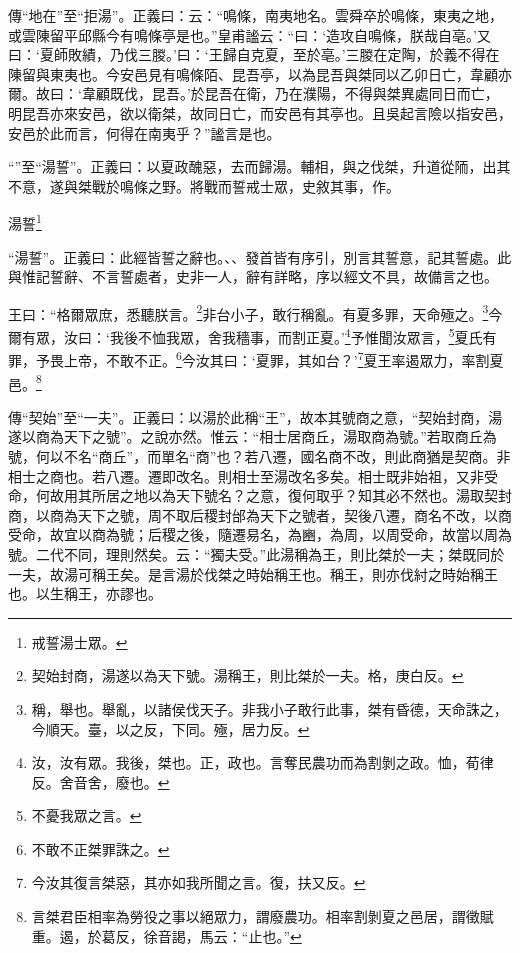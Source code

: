 {\noindent\zhuan{}\fzbyks 傳“地在”至“拒湯”。正義曰：云：“鳴條，南夷地名。雲舜卒於鳴條，東夷之地，或雲陳留平邱縣今有鳴條亭是也。”皇甫謐云：“曰：‘造攻自鳴條，朕哉自亳。’又曰：‘夏師敗績，乃伐三朡。’曰：‘王歸自克夏，至於亳。’三朡在定陶，於義不得在陳留與東夷也。今安邑見有鳴條陌、昆吾亭，以為昆吾與桀同以乙卯日亡，韋顧亦爾。故曰：‘韋顧既伐，昆吾。’於昆吾在衛，乃在濮陽，不得與桀異處同日而亡，明昆吾亦來安邑，欲以衛桀，故同日亡，而安邑有其亭也。且吳起言險以指安邑，安邑於此而言，何得在南夷乎？”謐言是也。 \par}

{\noindent\shu{}\fzkt “”至“湯誓”。正義曰：以夏政醜惡，去而歸湯。輔相，與之伐桀，升道從陑，出其不意，遂與桀戰於鳴條之野。將戰而誓戒士眾，史敘其事，作。 \par}

湯誓\footnote{戒誓湯士眾。}

{\noindent\shu{}\fzkt “湯誓”。正義曰：此經皆誓之辭也。、、發首皆有序引，別言其誓意，記其誓處。此與惟記誓辭、不言誓處者，史非一人，辭有詳略，序以經文不具，故備言之也。 \par}

王曰：“格爾眾庶，悉聽朕言。\footnote{契始封商，湯遂以為天下號。湯稱王，則比桀於一夫。格，庚白反。}非台小子，敢行稱亂。有夏多罪，天命殛之。\footnote{稱，舉也。舉亂，以諸侯伐天子。非我小子敢行此事，桀有昏德，天命誅之，今順天。臺，以之反，下同。殛，居力反。}今爾有眾，汝曰：‘我後不恤我眾，舍我穡事，而割正夏。’\footnote{汝，汝有眾。我後，桀也。正，政也。言奪民農功而為割剝之政。恤，荀律反。舍音舍，廢也。}予惟聞汝眾言，\footnote{不憂我眾之言。}夏氏有罪，予畏上帝，不敢不正。\footnote{不敢不正桀罪誅之。}今汝其曰：‘夏罪，其如台？’\footnote{今汝其復言桀惡，其亦如我所聞之言。復，扶又反。}夏王率遏眾力，率割夏邑。\footnote{言桀君臣相率為勞役之事以絕眾力，謂廢農功。相率割剝夏之邑居，謂徵賦重。遏，於葛反，徐音謁，馬云：“止也。”}


{\noindent\zhuan{}\fzbyks 傳“契始”至“一夫”。正義曰：以湯於此稱“王”，故本其號商之意，“契始封商，湯遂以商為天下之號”。之說亦然。惟云：“相士居商丘，湯取商為號。”若取商丘為號，何以不名“商丘”，而單名“商”也？若八遷，國名商不改，則此商猶是契商。非相士之商也。若八遷。遷即改名。則相士至湯改名多矣。相士既非始祖，又非受命，何故用其所居之地以為天下號名？之意，復何取乎？知其必不然也。湯取契封商，以商為天下之號，周不取后稷封邰為天下之號者，契後八遷，商名不改，以商受命，故宜以商為號；后稷之後，隨遷易名，為豳，為周，以周受命，故當以周為號。二代不同，理則然矣。云：“獨夫受。”此湯稱為王，則比桀於一夫；桀既同於一夫，故湯可稱王矣。是言湯於伐桀之時始稱王也。稱王，則亦伐紂之時始稱王也。以生稱王，亦謬也。 \par}

